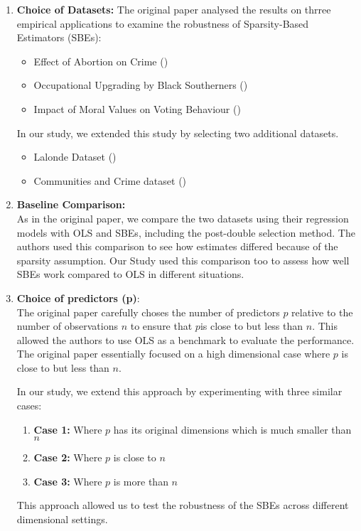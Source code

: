 \begin{enumerate}
    \item \textbf{Choice of Datasets:} 
    The original paper analysed the results on thrree empirical applications to examine the robustness of Sparsity-Based Estimators (SBEs):
    \begin{itemize}
        \item Effect of Abortion on Crime (\cite{abortionCrime})
        \item Occupational Upgrading by Black Southerners (\cite{blackWW2})
        \item Impact of Moral Values on Voting Behaviour (\cite{votingMoral})
    \end{itemize}
    In our study, we extended this study by selecting two additional datasets.
    \begin{itemize}
        \item Lalonde Dataset (\cite{dowhy})
        \item Communities and Crime dataset (\cite{misc_communities_and_crime_unnormalized_211})
    \end{itemize}

    \item \textbf{Baseline Comparison:}\\
    As in the original paper, we compare the two datasets using their regression models with OLS and SBEs, including the post-double selection method. The authors used this comparison to see how estimates differed because of the sparsity assumption. Our Study used this comparison too to assess how well SBEs work compared to OLS in different situations. 

    \item \textbf{Choice of predictors (p)}:\\
    The original paper carefully choses the number of predictors $p$ relative to the number of observations $n$ to ensure that $p$is close to but less than $n$. This allowed the authors to use OLS as a benchmark to evaluate the performance. The original paper essentially focused on a high dimensional case where $p$ is close to but less than $n$. 

    In our study, we extend this approach by experimenting with three similar cases:
    \begin{enumerate}
        \item \textbf{Case 1:} Where $p$ has its original dimensions which is much smaller than $n$
        \item \textbf{Case 2:} Where $p$ is close to $n$
        \item \textbf{Case 3:} Where $p$ is more than $n$
    \end{enumerate}
    This approach allowed us to test the robustness of the SBEs across different dimensional settings. 


\end{enumerate}
